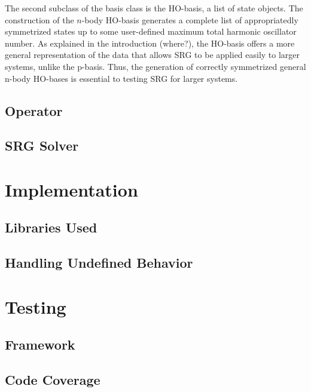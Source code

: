 The second subclass of the basis class is the HO-basis, a list of state objects. The construction of the $n$-body HO-basis generates a complete list of appropriatedly symmetrized states up to some user-defined maximum total harmonic oscillator number. As explained in the introduction (where?), the HO-basis offers a more general representation of the data that allows SRG to be applied easily to larger systems, unlike the p-basis. Thus, the generation of correctly symmetrized general n-body HO-bases is essential to testing SRG for larger systems.

\subsection{Operator}

\subsection{SRG Solver}

\section{Implementation}

\subsection{Libraries Used}

\subsection{Handling Undefined Behavior}

\section{Testing}

\subsection{Framework}

\subsection{Code Coverage}


